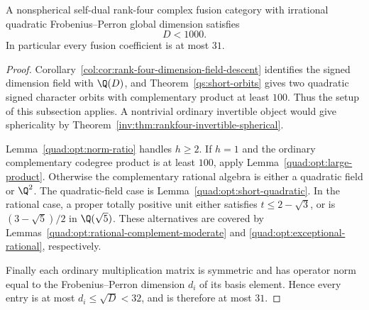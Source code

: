\begin{theorem}\label{quad:opt:unconditional}
A nonspherical self-dual rank-four complex fusion category with
irrational quadratic Frobenius--Perron global dimension satisfies
\[
 D<1000.
\]
In particular every fusion coefficient is at most $31$.
\end{theorem}
\begin{proof}
Corollary~\ref{col:cor:rank-four-dimension-field-descent} identifies
the signed dimension field with $\Q(D)$, and
Theorem~\ref{qs:short-orbits} gives two quadratic signed character
orbits with complementary product at least $100$. Thus the setup of
this subsection applies. A nontrivial ordinary invertible object
would give sphericality by
Theorem~\ref{inv:thm:rankfour-invertible-spherical}.

Lemma~\ref{quad:opt:norm-ratio} handles $h\ge2$. If $h=1$ and the
ordinary complementary codegree product is at least $100$, apply
Lemma~\ref{quad:opt:large-product}. Otherwise the complementary
rational algebra is either a quadratic field or $\Q^2$.
The quadratic-field case is Lemma~\ref{quad:opt:short-quadratic}.
In the rational case, a proper totally positive unit either satisfies
$t\le2-\sqrt3$, or is $(3-\sqrt5)/2$ in $\Q(\sqrt5)$.
These alternatives are covered by
Lemmas~\ref{quad:opt:rational-complement-moderate} and
\ref{quad:opt:exceptional-rational}, respectively.

Finally each ordinary multiplication matrix is symmetric and has
operator norm equal to the Frobenius--Perron dimension $d_i$ of its
basis element. Hence every entry is at most $d_i\le\sqrt D<32$,
and is therefore at most $31$.
\end{proof}


